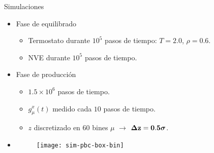 \documentclass{beamer}
\begin{document}
\begin{frame}{Simulaciones}
   \begin{itemize}
     \item<1-> Fase de \alert{equilibrado}
       \begin{itemize}
         \item Termostato durante $10^5$ pasos de tiempo: $T=2.0$, $\rho=0.6$.
         \item NVE durante $10^5$ pasos de tiempo.
          \end{itemize}
        \item<2-> Fase de \alert{producción}
       \begin{itemize}
         \item $1.5\times10^6$ pasos de tiempo.
         \item $g_{\mu}^x(t)$ medido cada $10$ pasos de tiempo.
         \item $z$ discretizado en $60$ bines $\mu$ $\rightarrow$ {$\boldsymbol{\Delta} {\bf z=0.5}\boldsymbol{\sigma}$}.
         \end{itemize}
       \item<2->[]\begin{figure}
    \texttt{[image: sim-pbc-box-bin]}
  \end{figure}
     \end{itemize}
 \end{frame}

\end{document}
